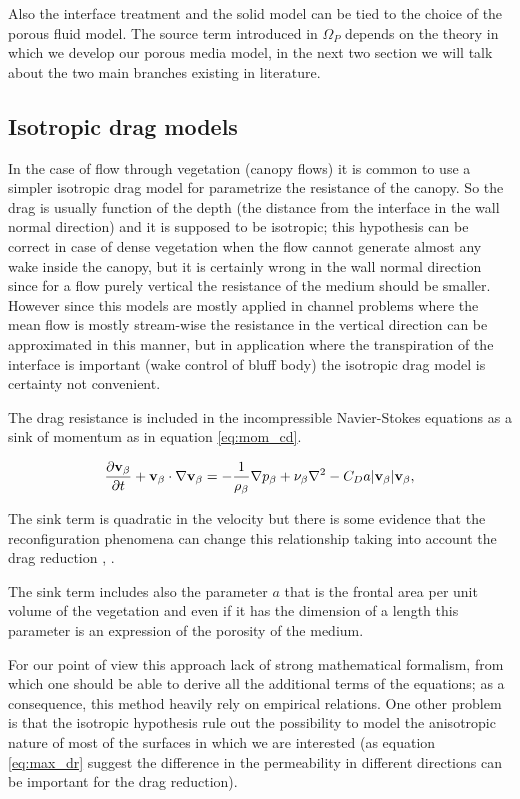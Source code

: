 Also the interface treatment and the solid model can be tied to the choice of the porous fluid model.
The source term introduced in $\Omega_{P}$ depends on the theory in which we develop our porous media model, in the next two section we will talk about the two main branches existing in literature.

\subsection{Isotropic drag models}
\label{sec:canopy_eq}

In the case of flow through vegetation (canopy flows) it is common to use a simpler isotropic drag model for parametrize the resistance of the canopy.
So the drag is usually function of the depth (the distance from the interface in the wall normal direction) and it is supposed to be isotropic; this hypothesis can be correct in case of dense vegetation when the flow cannot generate almost any wake inside the canopy, but it is certainly wrong in the wall normal direction since for a flow purely vertical the resistance of the medium should be smaller.
However since this models are mostly applied in channel problems where the mean flow is mostly stream-wise the resistance in the vertical direction can be approximated in this manner, but in application where the transpiration of the interface is important (wake control of bluff body) the isotropic drag model is certainty not convenient.

The drag resistance is included in the incompressible Navier-Stokes equations as a sink of momentum as in equation \ref{eq:mom_cd}.

\begin{equation}
\frac{\partial \textbf{v}_{\beta}}{\partial t} + \textbf{v}_{\beta} \cdot \nabla \textbf{v}_{\beta} = -\frac{1}{\rho_{\beta}} \nabla p_{\beta} + \nu_{\beta} \nabla^2 -C_D a |\textbf{v}_{\beta}| \textbf{v}_{\beta}, 
\label{eq:mom_cd}
\end{equation}

The sink term is quadratic in the velocity but there is some evidence that the reconfiguration phenomena can change this relationship taking into account the drag reduction \citet{gosselin2011drag}, \citet{alvarado2017nature}.

The sink term includes also the parameter $a$ that is the frontal area per unit volume of the vegetation and even if it has the dimension of a length this parameter is an expression of the porosity of the medium.

For our point of view this approach lack of strong mathematical formalism, from which one should be able to derive all the additional terms of the equations; as a consequence, this method heavily rely on empirical relations.
One other problem is that the isotropic hypothesis rule out the possibility to model the anisotropic nature of most of the surfaces in which we are interested (as equation \ref{eq:max_dr} suggest the difference in the permeability in different directions can be important for the drag reduction).

